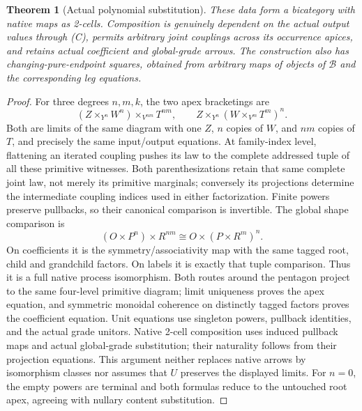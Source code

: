 \documentclass[11pt]{article}
\newtheorem{theorem}{Theorem}\newtheorem{proposition}[theorem]{Proposition}
\newcommand{\B}{\mathcal B}\newcommand{\E}{\mathcal E}\newcommand{\D}{\mathcal D}
\begin{document}
\begin{theorem}[Actual polynomial substitution]
These data form a bicategory with native maps as 2-cells. Composition is genuinely dependent on the actual output values through (C), permits arbitrary joint couplings across its occurrence apices, and retains actual coefficient and global-grade arrows. The construction also has changing-pure-endpoint squares, obtained from arbitrary maps of objects of $\B$ and the corresponding leg equations.
\end{theorem}
\begin{proof}
For three degrees $n,m,k$, the two apex bracketings are
\[
 (Z\times_{Y^n}W^n)\times_{V^{nm}}T^{nm},\qquad
 Z\times_{Y^n}(W\times_{V^m}T^m)^n.
\]
Both are limits of the same diagram with one $Z$, $n$ copies of $W$, and $nm$ copies of $T$, and precisely the same input/output equations. At family-index level, flattening an iterated coupling pushes its law to the complete addressed tuple of all these primitive witnesses. Both parenthesizations retain that same complete joint law, not merely its primitive marginals; conversely its projections determine the intermediate coupling indices used in either factorization. Finite powers preserve pullbacks, so their canonical comparison is invertible. The global shape comparison is
\[
 (O\times P^n)\times R^{nm}\cong O\times(P\times R^m)^n.
\]
On coefficients it is the symmetry/associativity map with the same tagged root, child and grandchild factors. On labels it is exactly that tuple comparison. Thus it is a full native process isomorphism. Both routes around the pentagon project to the same four-level primitive diagram; limit uniqueness proves the apex equation, and symmetric monoidal coherence on distinctly tagged factors proves the coefficient equation. Unit equations use singleton powers, pullback identities, and the actual grade unitors. Native 2-cell composition uses induced pullback maps and actual global-grade substitution; their naturality follows from their projection equations. This argument neither replaces native arrows by isomorphism classes nor assumes that $U$ preserves the displayed limits. For $n=0$, the empty powers are terminal and both formulas reduce to the untouched root apex, agreeing with nullary content substitution.
\end{proof}
\end{document}

